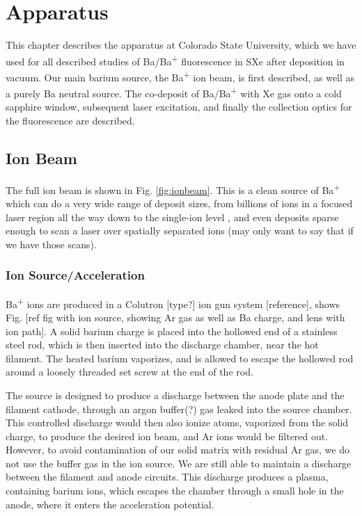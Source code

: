 \chapter{Apparatus}

This chapter describes the apparatus at Colorado State University, which we have used for all described studies of Ba/Ba\textsuperscript{+} fluorescence in SXe after deposition in vacuum.  Our main barium source, the Ba\textsuperscript{+} ion beam, is first described, as well as a purely Ba neutral source.  The co-deposit of Ba/Ba\textsuperscript{+} with Xe gas onto a cold sapphire window, subsequent laser excitation, and finally the collection optics for the fluorescence are described.

\section{Ion Beam}

The full ion beam is shown in Fig. \ref{fig:ionbeam}.  This is a clean source of Ba\textsuperscript{+} which can do a very wide range of deposit sizes, from billions of ions in a focused laser region all the way down to the single-ion level {\color{gray}, and even deposits sparse enough to scan a laser over spatially separated ions (may only want to say that if we have those scans)}.

\subsection{Ion Source/Acceleration}

Ba\textsuperscript{+} ions are produced in a Colutron [type?] ion gun system [reference], shows Fig. [ref fig with ion source, showing Ar gas as well as Ba charge, and lens with ion path].  A solid barium charge is placed into the hollowed end of a stainless steel rod, which is then inserted into the discharge chamber, near the hot filament.  The heated barium vaporizes, and is allowed to escape the hollowed rod around a loosely threaded set screw at the end of the rod.

The source is designed to produce a discharge between the anode plate and the filament cathode, through an argon buffer(?) gas leaked into the source chamber.  This controlled discharge would then also ionize atoms, vaporized  from the solid charge, to produce the desired ion beam, and Ar ions would be filtered out.  However, to avoid contamination of our solid matrix with residual Ar gas, we do not use the buffer gas in the ion source.  We are still able to maintain a discharge between the filament and anode circuits.  This discharge produces a plasma, containing barium ions, which escapes the chamber through a small hole in the anode, where it enters the acceleration potential.

